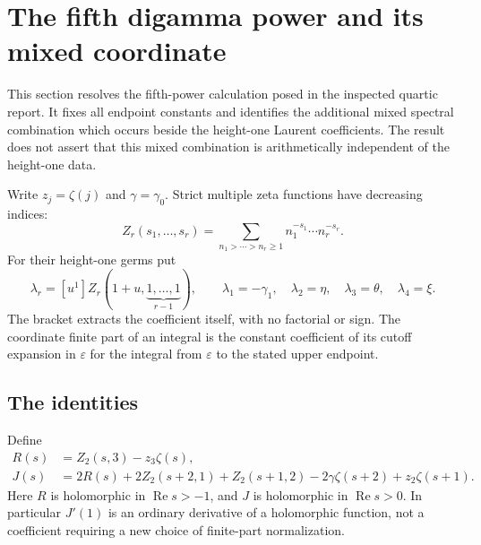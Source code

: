 \section{The fifth digamma power and its mixed coordinate}
\label{q5:section}

This section resolves the fifth-power calculation posed in the inspected
quartic report.  It fixes all endpoint constants and identifies the
additional mixed spectral combination which occurs beside the
height-one Laurent coefficients.  The result does not assert that this
mixed combination is arithmetically independent of the height-one data.

Write $z_j=\zeta(j)$ and $\gamma=\gamma_0$.  Strict multiple zeta
functions have decreasing indices:
\[
 Z_r(s_1,\ldots,s_r)
   =\sum_{n_1>\cdots>n_r\geq1}
        n_1^{-s_1}\cdots n_r^{-s_r}.
\]
For their height-one germs put
\begin{equation}\label{q5:lambda}
 \lambda_r=[u^1]Z_r(1+u,\underbrace{1,\ldots,1}_{r-1}),
 \qquad
 \lambda_1=-\gamma_1,\quad
 \lambda_2=\eta,\quad\lambda_3=\theta,\quad\lambda_4=\xi.
\end{equation}
The bracket extracts the coefficient itself, with no factorial or sign.
The coordinate finite part of an integral is the constant coefficient
of its cutoff expansion in $\varepsilon$ for the integral from
$\varepsilon$ to the stated upper endpoint.

\subsection{The identities}

Define
\begin{align}
 R(s)&=Z_2(s,3)-z_3\zeta(s),\label{q5:R}\\
 J(s)&=2R(s)+2Z_2(s+2,1)+Z_2(s+1,2)
                 -2\gamma\zeta(s+2)+z_2\zeta(s+1).
 \label{q5:J}
\end{align}
Here $R$ is holomorphic in $\operatorname{Re}s>-1$, and $J$ is
holomorphic in $\operatorname{Re}s>0$.  In particular $J'(1)$ is an
ordinary derivative of a holomorphic function, not a coefficient
requiring a new choice of finite-part normalization.

